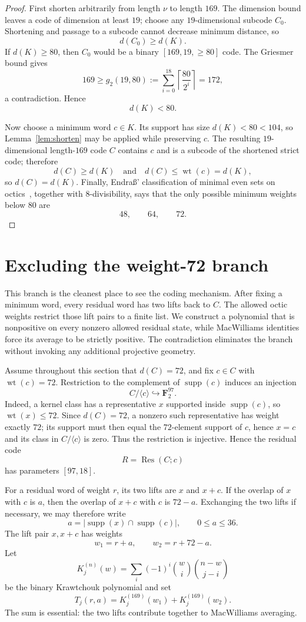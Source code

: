\documentclass[11pt,reqno]{amsart}
\theoremstyle{remark}
\newcommand{\F}{\mathbf F}
\newcommand{\supp}{\operatorname{supp}}
\newcommand{\wt}{\operatorname{wt}}
\newcommand{\Res}{\operatorname{Res}}
\begin{document}
\begin{proof}
First shorten arbitrarily from length $\nu$ to length $169$.  The dimension bound leaves a code of dimension at least $19$; choose any $19$-dimensional subcode $C_0$.  Shortening and passage to a subcode cannot decrease minimum distance, so
\[
d(C_0)\ge d(K).
\]
If $d(K)\ge80$, then $C_0$ would be a binary $[169,19,\ge80]$ code.  The Griesmer bound gives
\[
169\ge g_2(19,80):=\sum_{i=0}^{18}\left\lceil\frac {80}{2^i}\right\rceil=172,
\]
a contradiction.  Hence
\[
d(K)<80.
\]

Now choose a minimum word $c\in K$.  Its support has size $d(K)<80<104$, so Lemma~\ref{lem:shorten} may be applied while preserving $c$.  The resulting $19$-dimensional length-$169$ code $C$ contains $c$ and is a subcode of the shortened strict code; therefore
\[
d(C)\ge d(K)
\quad\text{and}\quad
 d(C)\le\wt(c)=d(K),
\]
so $d(C)=d(K)$.  Finally, Endra\ss' classification of minimal even sets on octics~\cite{EndrassMinimal}, together with $8$-divisibility, says that the only possible minimum weights below $80$ are
\[
48,\qquad64,\qquad72.
\]
\end{proof}

\section{Excluding the weight-72 branch}\label{sec:w72}
This branch is the cleanest place to see the coding mechanism.  After fixing a minimum word, every residual word has two lifts back to $C$.  The allowed octic weights restrict those lift pairs to a finite list.  We construct a polynomial that is nonpositive on every nonzero allowed residual state, while MacWilliams identities force its average to be strictly positive.  The contradiction eliminates the branch without invoking any additional projective geometry.

Assume throughout this section that $d(C)=72$, and fix $c\in C$ with $\wt(c)=72$.  Restriction to the complement of $\supp(c)$ induces an injection
\[
C/\langle c\rangle\hookrightarrow\F_2^{97}.
\]
Indeed, a kernel class has a representative $x$ supported inside $\supp(c)$, so $\wt(x)\le72$.  Since $d(C)=72$, a nonzero such representative has weight exactly $72$; its support must then equal the $72$-element support of $c$, hence $x=c$ and its class in $C/\langle c\rangle$ is zero.  Thus the restriction is injective.  Hence the residual code
\[
R=\Res(C;c)
\]
has parameters $[97,18]$.

For a residual word of weight $r$, its two lifts are $x$ and $x+c$.  If the overlap of $x$ with $c$ is $a$, then the overlap of $x+c$ with $c$ is $72-a$.  Exchanging the two lifts if necessary, we may therefore write
\[
a=|\supp(x)\cap\supp(c)|,
\qquad 0\le a\le36.
\]
The lift pair $x,x+c$ has weights
\[
w_1=r+a,
\qquad
w_2=r+72-a.
\]
Let
\[
K_j^{(n)}(w)=\sum_i(-1)^i\binom wi\binom{n-w}{j-i}
\]
be the binary Krawtchouk polynomial and set
\[
T_j(r,a)=K_j^{(169)}(w_1)+K_j^{(169)}(w_2).
\]
The sum is essential: the two lifts contribute together to MacWilliams averaging.
\end{document}
